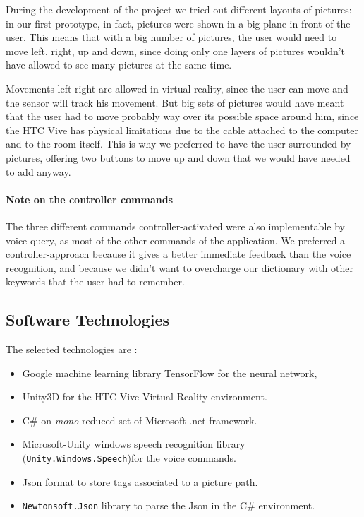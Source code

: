 \documentclass[11pt,a4paper]{article}
\begin{document}
During the development of the project we tried out different layouts of pictures: in our first prototype, in fact, pictures were shown in a big plane in front of the user. This means that with a big number of pictures, the user would need to move left, right, up and down, since doing only one layers of pictures wouldn't have allowed to see many pictures at the same time.

Movements left-right are allowed in virtual reality, since the user can move and the sensor will track his movement. But big sets of pictures would have meant that the user had to move probably way over its possible space around him, since the HTC Vive has physical limitations due to the cable attached to the computer and to the room itself.
This is why we preferred to have the user surrounded by pictures, offering two buttons to move up and down that we would have needed to add anyway.

\paragraph{Note on the controller commands} The three different commands controller-activated were also implementable by voice query, as most of the other commands of the application.
We preferred a controller-approach because it gives a better immediate feedback than the voice recognition, and because we didn't want to overcharge our dictionary with other keywords that the user had to remember.
\subsection{Software Technologies} \label{techntechno}

The selected technologies are :
\begin{itemize}
	\item Google machine learning library TensorFlow for the neural network,
	\item Unity3D for the HTC Vive Virtual Reality environment.
	\item C$\#$ on \textit{mono} reduced set of Microsoft .net framework.
	\item Microsoft-Unity windows speech recognition library (\texttt{Unity.Windows.Speech})for the voice commands.
	\item Json format to store tags associated to a picture path.
	\item \texttt{Newtonsoft.Json} library to parse the Json in the C$\#$ environment.
\end{itemize}
\end{document}
